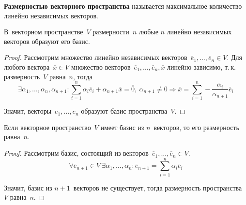 \textbf{Размерностью векторного пространства} называется максимальное количество линейно независимых векторов.

\begin{theorem}
В~векторном пространстве~$V$ размерности~$n$ любые $n$ линейно независимых векторов образуют его базис.
\end{theorem}
\begin{proof}
Рассмотрим множество линейно независимых векторов~$\overline e_1, \ldots, \overline e_n \in V$.
Для любого вектора~$\overline x \in V$ множество векторов~$\overline e_1, \ldots, \overline e_n, \overline x$ линейно зависимо, т.\,к. размерность~$V$ равна~$n$, тогда
\begin{equation*}
\exists \alpha_1, \ldots, \alpha_n, \alpha_{n+1} \colon
\sum_{i=1}^n \alpha_i \overline e_i + \alpha_{n+1} \overline x = \overline 0, \
\alpha_{n+1} \neq 0 \Rightarrow
\overline x = \sum_{i=1}^n -\frac{\alpha_i}{\alpha_{n+1}} \overline e_i
\end{equation*}

Значит, векторы~$\overline e_1, \ldots, \overline e_n$ образуют базис пространства~$V$.
\end{proof}

\begin{theorem}
Если векторное пространство~$V$ имеет базис из $n$~векторов, то его размерность равна~$n$.
\end{theorem}
\begin{proof}
Рассмотрим базис, состоящий из векторов~$\overline e_1, \ldots, \overline e_n \in V$.
\begin{equation*}
\forall \overline e_{n+1} \in V \
\exists \alpha_1, \ldots, \alpha_n \colon
\overline e_{n+1} = \sum_{i=1}^n \alpha_i \overline e_i
\end{equation*}

Значит, базис из $n + 1$~векторов не существует, тогда размерность пространства~$V$ равна~$n$.
\end{proof}